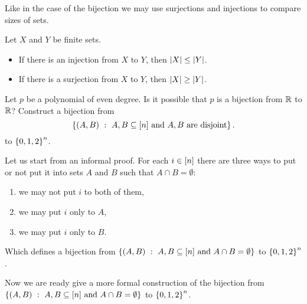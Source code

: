 Like in the case of the bijection we may use surjections and injections to
compare sizes of sets.
\begin{theorem}
\label{theorem:injections-surjections-inequalities}
  Let $X$ and $Y$ be finite sets.
  \begin{itemize}
    \item If there is an injection from $X$ to $Y$, then $\left|{X}\right|
      \le \left|{Y}\right|$.
    \item If there is a surjection from $X$ to $Y$, then $\left|{X}\right|
      \ge \left|{Y}\right|$.
  \end{itemize}
\end{theorem}

\begin{chapterendexercises}
  \exercise Let $p$ be a polynomial of even degree. Is it possible that $p$ is a
    bijection from ${\mathbb{R}}$ to ${\mathbb{R}}$?
  \exercise[recommended] Construct a bijection from
    \[
      \set[{A, B \subseteq \range{n} \text{ and } A, B \text{ are disjoint}}]{(A, B)}.
    \]
    to $\set{0, 1, 2}^n$.
    \begin{solution}
      Let us start from an informal proof. For each $i \in {[{n}]}$ there are
      three ways to put or not put it into sets $A$ and $B$ such that $A \cap B
      = \emptyset$:
      \begin{enumerate}
        \item we may not put $i$ to both of them,
        \item we may put $i$ only to $A$,
        \item we may put $i$ only to $B$.
      \end{enumerate}
      Which defines a bijection from 
      $\set[{A, B \subseteq [n] \text{ and } A \cap B = \emptyset}]{(A, B)}$ to
      $\set{0, 1, 2}^n$.

      Now we are ready give a more formal construction of the bijection from
      $\set[{A, B \subseteq [n] \text{ and } A \cap B = \emptyset}]{(A, B)}$ to
      $\set{0, 1, 2}^n$.


\end{solution}
\end{chapterendexercises}
